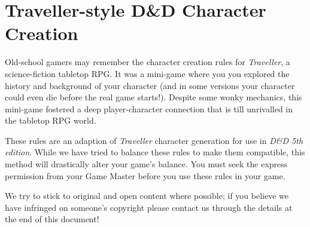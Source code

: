 \documentclass[10pt,twoside]{article}
\begin{document}
\section*{Traveller-style D\&D Character Creation}
\addtocounter{section}{1}

Old-school gamers may remember the character creation rules for \textit{Traveller}, a science-fiction tabletop RPG. It was a mini-game where you you explored the history and background of your character (and in some versions your character could even die before the real game starts!). Despite some wonky mechanics, this mini-game fostered a deep player-character connection that is till unrivalled in the tabletop RPG world.

These rules are an adaption of \textit{Traveller} character generation for use in \textit{D\&D 5th edition}. While we have tried to balance these rules to make them compatible, this method will drastically alter your game's balance. You must seek the express permission from your Game Master before you use these rules in your game.

We try to stick to original and open content where possible; if you believe we have infringed on someone's copyright please contact us through the details at the end of this document!
\end{document}
